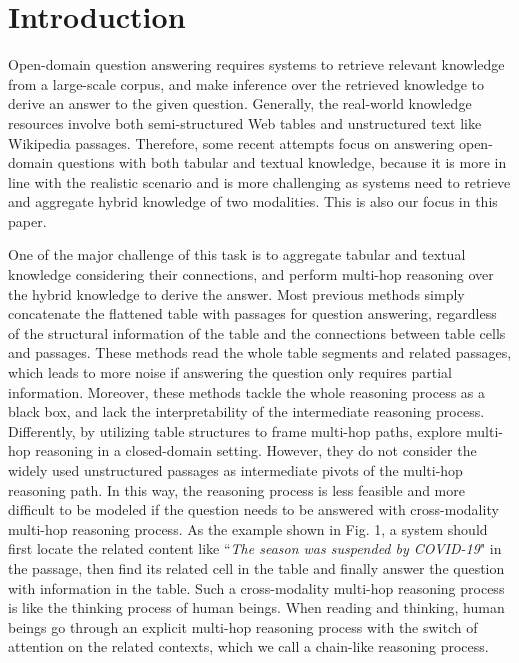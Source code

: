 \documentclass[11pt]{article}
\begin{document}
	\section{Introduction}
	
	Open-domain question answering \cite{joshi2017triviaqa,dunn2017searchqa,nqopen} requires systems to retrieve relevant knowledge from a large-scale corpus, and make inference over the retrieved knowledge to derive an answer to the given question. 
	Generally, the real-world knowledge resources involve both semi-structured Web tables and unstructured text like Wikipedia passages. 
	Therefore, some recent attempts \cite{chen2020open} focus on answering open-domain questions with both tabular and textual knowledge, because it is more in line with the realistic scenario and is more challenging as systems need to retrieve and aggregate hybrid knowledge of two modalities. 
	This is also our focus in this paper.
	


	One of the major challenge of this task is to aggregate tabular and textual knowledge considering their connections, and perform multi-hop reasoning over the hybrid knowledge to derive the answer.
Most previous methods \cite{chen2020open,li2021dual} simply concatenate the flattened table with passages for question answering, regardless of the structural information of the table and the connections between table cells and passages.
	These methods read the whole table segments and related passages, which leads to more noise if answering the question only requires partial information.
Moreover, these methods tackle the whole reasoning process as a black box, and lack the interpretability of the intermediate reasoning process. 
Differently, by utilizing table structures to frame multi-hop paths, \citet{chen2020hybridqa} explore multi-hop reasoning in a closed-domain setting.
However, they do not consider the widely used unstructured passages as intermediate pivots of the multi-hop reasoning path.
In this way, the reasoning process is less feasible and more difficult to be modeled if the question needs to be answered with cross-modality multi-hop reasoning process.
As the example shown in Fig. 1, a system should first locate the related content like ``\textit{The season was suspended by COVID-19}" in the passage, then find its related cell in the table and finally answer the question with information in the table. 
Such a cross-modality multi-hop reasoning process is like the thinking process of human beings.
	When reading and thinking, human beings go through an explicit multi-hop reasoning process with the switch of attention on the related contexts, which we call a chain-like reasoning process.
\end{document}
